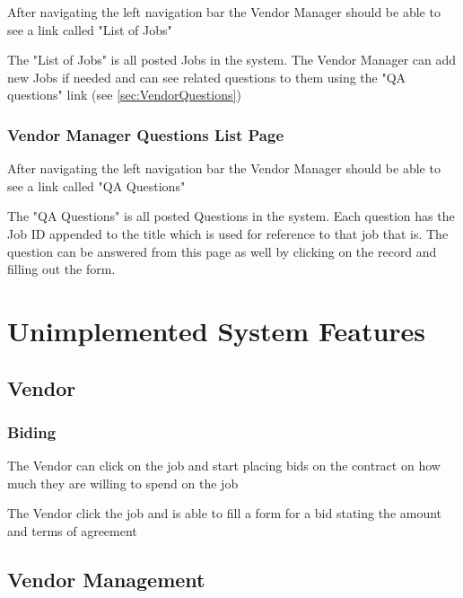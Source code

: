 \documentclass[10pt]{article}
\newcounter{subsubsubsection}[subsubsection]
\begin{document}
After navigating the left navigation bar the Vendor Manager should be able to see a link called "List of Jobs"


The "List of Jobs" is all posted Jobs in the system. The Vendor Manager can add new Jobs if needed and can see related questions to them using the "QA questions" link (see \vref{sec:VendorQuestions})

\subsubsection{Vendor Manager Questions List Page}\label{sec:VendorQuestions}


After navigating the left navigation bar the Vendor Manager should be able to see a link called "QA Questions"


The "QA Questions" is all posted Questions in the system. Each question has the Job ID appended to the title which is used for reference to that job that is. The question can be answered from this page as well by clicking on the record and filling out the form.

\section{Unimplemented System Features}

\subsection{Vendor}

\subsubsection{Biding}


The Vendor can click on the job and start placing bids on the contract on how much they are willing to spend on the job

 	
The Vendor click the job and is able to fill a form for a bid stating the amount and terms of agreement

\subsection{Vendor Management}
\end{document}
